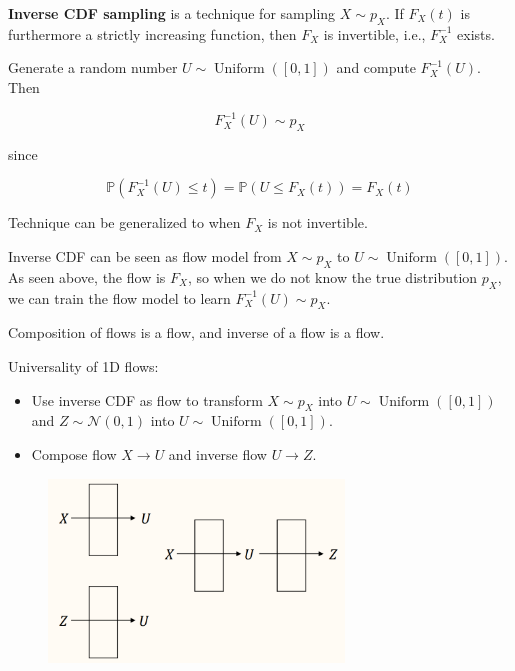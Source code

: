 \documentclass{report}
\begin{document}
\begin{concept}
    \textbf{Inverse CDF sampling} is a technique for sampling $X \sim p_{X}$.
    If $F_{X}(t)$ is furthermore a strictly increasing function, then $F_{X}$ is invertible, i.e., $F_{X}^{-1}$ exists.

    Generate a random number $U \sim \operatorname{Uniform}([0,1])$ and compute $F_{X}^{-1}(U)$. Then

    $$
    F_{X}^{-1}(U) \sim p_{X}
    $$

    since

    $$
    \mathbb{P}\left(F_{X}^{-1}(U) \leq t\right)=\mathbb{P}\left(U \leq F_{X}(t)\right)=F_{X}(t)
    $$

    Technique can be generalized to when $F_{X}$ is not invertible.

    \par\noindent\textcolor{gray}{\hdashrule{\textwidth}{0.4pt}{1pt 2pt}}

    Inverse CDF can be seen as flow model from $X \sim p_X$ to $U \sim \operatorname{Uniform}([0,1])$.
    As seen above, the flow is $F_X$, so when we do not know the true distribution $p_X$, we can train the flow model to learn $F_{X}^{-1}(U) \sim p_{X}$.
\end{concept}

\begin{concept}
    Composition of flows is a flow, and inverse of a flow is a flow.

    Universality of 1D flows:

    \begin{itemize}
        \item Use inverse CDF as flow to transform $X \sim p_{X}$ into $U \sim \operatorname{Uniform}([0,1])$ and $Z \sim \mathcal{N}(0,1)$ into $U \sim \operatorname{Uniform}([0,1])$.
        \item Compose flow $X \rightarrow U$ and inverse flow $U \rightarrow Z$.
    \end{itemize}

    \begin{figure}[H]
        \centering
        \includegraphics[width=0.7\textwidth]{.././assets/10.11.png}
    \end{figure}
\end{concept}
\end{document}
